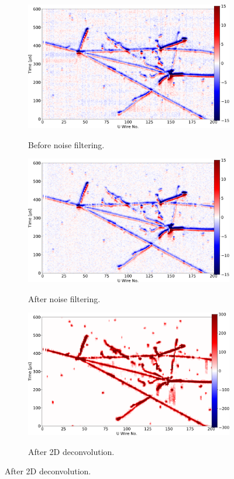 \begin{figure}

	\centering

	\begin{subfigure}{0.48\textwidth}
		\includegraphics[width=\textwidth]{figures/protodune_evd_orig.pdf}
		\label{fig:pdsp_raw}
		\caption{Before noise filtering.}
	\end{subfigure}
	\hfill
	\begin{subfigure}{0.48\textwidth}
		\includegraphics[width=\textwidth]{figures/protodune_evd_raw.pdf}
		\label{fig:pdsp_filt}
		\caption{After noise filtering.}
	\end{subfigure}
	\begin{subfigure}{0.48\textwidth}
		\vspace{5mm}
		\includegraphics[width=\textwidth]{figures/protodune_evd_decon.pdf}
		\label{fig:pdsp_deconv}
		\caption{After 2D deconvolution.}
	\end{subfigure}


\end{figure}
